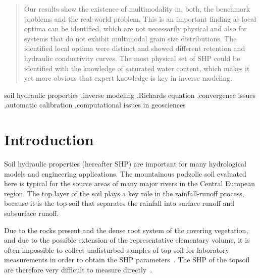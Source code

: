 \documentclass[review,times,3p,10pt]{elsarticle}
\begin{document}
\begin{frontmatter}
\begin{abstract}
Our results show the existence of multimodality in, both, the benchmark problems and the real-world problem. This is an important finding as local optima can be identified, which are not necessarily physical and also for systems that do not exhibit multimodal grain size distributions. The identified local optima were distinct and showed different retention and hydraulic conductivity curves. The most physical set of SHP could be identified with the knowledge of saturated water content, which makes it yet more obvious that expert knowledge is key in inverse modeling.   




\end{abstract}

\begin{keyword}
soil hydraulic properties \sep inverse modeling \sep Richards equation \sep convergence issues  \sep automatic calibration \sep computational issues in geosciences  


\end{keyword}

\end{frontmatter}

\linenumbers

\section{Introduction}%

Soil hydraulic properties (hereafter SHP) are important for many hydrological models and engineering applications. The mountainous podzolic soil evaluated here is typical for the source areas of many major rivers in the Central European region. The top layer of the soil plays a key role in the rainfall-runoff process, because it is the top-soil that separates the rainfall into surface runoff and subsurface runoff. 


Due to the rocks present and the dense root system of the covering vegetation, and due to the possible extension of the representative elementary volume, it is often impossible to collect undisturbed samples of top-soil for laboratory measurements in order to obtain the SHP parameters~\citep{Jacka1}. The SHP of the topsoil are therefore very difficult to measure directly~\citep{Fodor, Jacka1}. 
\end{document}
